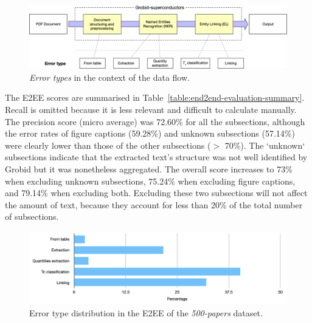 \begin{figure}[htbp]
    \centering
    \includegraphics[width=\textwidth]{figures/automatic_extraction_supercon/error-types-colors}
    \caption{\textit{Error types} in the context of the data flow. }
    \label{fig:error-types}
\end{figure}

The E2EE scores are summarised in Table~\ref{table:end2end-evaluation-summary}.
Recall is omitted because it is less relevant and difficult to calculate manually.
The precision score (micro average) was 72.60\% for all the subsections, although the error rates of figure captions (59.28\%) and unknown subsections (57.14\%) were clearly lower than those of the other subsections ($>$ 70\%).
The `unknown` subsections indicate that the extracted text's structure was not well identified by Grobid but it was nonetheless aggregated.
The overall score increases to 73\% when excluding unknown subsections, 75.24\% when excluding figure captions, and 79.14\%  when excluding both.
Excluding these two subsections will not affect the amount of text, because they account for less than 20\% of the total number of subsections.

\begin{figure}[htbp]
    \centering
    \includegraphics[width=\linewidth]{figures/automatic_extraction_supercon/error-types-bars-perc}
    \caption{Error type distribution in the E2EE of the \textit{500-papers} dataset.}
    \label{fig:error-types-distribution}
\end{figure}


